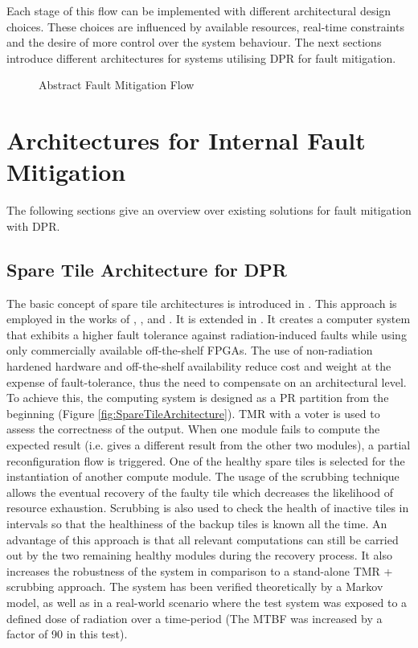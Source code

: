     Each stage of this flow can be implemented with different architectural design choices.
These choices are influenced by available resources, real-time constraints and the desire of more control over the system behaviour.
The next sections introduce different architectures for systems utilising \gls{DPR} for fault mitigation.
\begin{center}
\begin{figure}[h]
    \centering
    \resizebox{\smallColumnWidth}{!} {
        
    }
\caption{Abstract Fault Mitigation Flow}
\label{fig:internalFaultFlow}
\end{figure}
\end{center}
\section{Architectures for Internal Fault Mitigation}\label{InternalFaultsArch}
The following sections give an overview over existing solutions for fault mitigation with \gls{DPR}. 

\subsection{Spare Tile Architecture for \gls{DPR}}\label{sec:SpareTileArchitecture}
The basic concept of spare tile architectures is introduced in \cite{bolchini2007}. 
This approach is employed in the works of \cite{davis2014}, \cite{kastil2012}, \cite{zhang2013} and \cite{lameres2015}. 
It is extended in \cite{wilson_hybrid_2017}.
It creates a computer system that exhibits a higher fault tolerance against radiation-induced faults while using only commercially available off-the-shelf \glspl{FPGA}.
The use of non-radiation hardened hardware and off-the-shelf availability reduce cost and weight at the expense of fault-tolerance, thus the need to compensate on an architectural level. 
To achieve this, the computing system is designed as a \gls{PR} partition from the beginning (Figure \ref{fig:SpareTileArchitecture}). 
\gls{TMR} with a voter is used to assess the correctness of the output. 
When one module fails to compute the expected result (i.e. gives a different result from the other two modules), a partial reconfiguration flow is triggered.
One of the healthy spare tiles is selected for the instantiation of another compute module.
The usage of the scrubbing technique allows the eventual recovery of the faulty tile which decreases the likelihood of resource exhaustion. 
Scrubbing is also used to check the health of inactive tiles in intervals so that the healthiness of the backup tiles is known all the time. 
An advantage of this approach is that all relevant computations can still be carried out by the two remaining healthy modules during the recovery process. 
It also increases the robustness of the system in comparison to a stand-alone \gls{TMR} + scrubbing approach.
The system has been verified theoretically by a Markov model, as well as in a real-world scenario where the test system was exposed to a defined dose of radiation over a time-period (The \gls{MTBF} was increased by a factor of 90 in this test).

